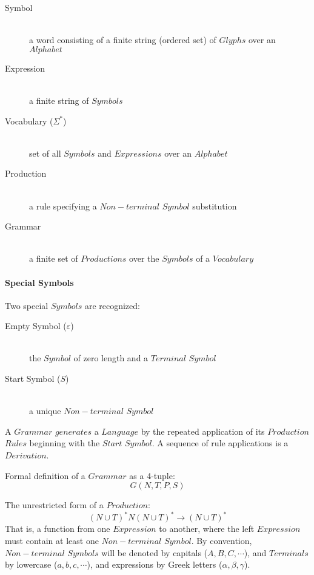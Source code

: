 \documentclass{article}
\begin{document}
    \begin{description}

    \item[Symbol] \hfill \\
    a word consisting of a finite string (ordered set) of $Glyphs$
    over an $Alphabet$

    \item[Expression] \hfill \\
    a finite string of $Symbols$

    \item[Vocabulary ($\Sigma^{*}$)] \hfill \\
    set of all $Symbols$ and $Expressions$ over an $Alphabet$

    \item[Production] \hfill \\
    a rule specifying a $Non-terminal$ $Symbol$ substitution

    \item[Grammar] \hfill \\
    a finite set of $Productions$ over the $Symbols$ of a $Vocabulary$

    \end{description}

\paragraph{Special Symbols}

Two special $Symbols$ are recognized:

    \begin{description}

    \item[Empty Symbol ($\varepsilon$)] \hfill \\
    the $Symbol$ of zero length and a $Terminal$ $Symbol$

    \item[Start Symbol ($S$)] \hfill \\
    a unique $Non-terminal$ $Symbol$

    \end{description}

A $Grammar$ $generates$ a $Language$ by the repeated application
of its $Production$ $Rules$ beginning with the $Start$ $Symbol$. A
sequence of rule applications is a $Derivation$.

Formal definition of a $Grammar$ as a 4-tuple:
\[
    G(N,T,P,S)
\]

The unrestricted form of a $Production$:
\[
    (N \cup T)^*N(N \cup T)^* \rightarrow (N \cup T)^*
\]
That is, a function from one $Expression$ to another, where the left
$Expression$ must contain at least one $Non-terminal$ $Symbol$. By
convention, $Non-terminal$ $Symbols$ will be denoted by capitals
($A,B,C,\cdots$), and $Terminals$ by lowercase ($a,b,c,\cdots$), and
expressions by Greek letters ($\alpha,\beta,\gamma$).
\end{document}
